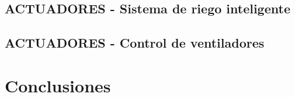 \documentclass{article}
\begin{document}


\subsection{ACTUADORES - Sistema de riego inteligente}



\subsection{ACTUADORES - Control de ventiladores}



\section{Conclusiones}
\end{document}
